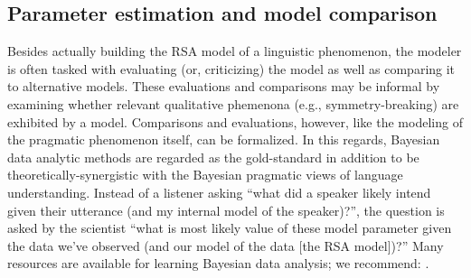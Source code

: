 \documentclass{sp}
\newcommand{\gcs}[1]{\textcolor{blue}{[gcs: #1]}}
\newcommand{\mht}[1]{\textcolor{purple}{[mht: #1]}}
\begin{document}




\subsection{Parameter estimation and model comparison}

Besides actually building the RSA model of a linguistic phenomenon, the modeler is often tasked with evaluating (or, criticizing) the model as well as comparing it to alternative models.
These evaluations and comparisons may be informal by examining whether relevant qualitative phemenona (e.g., symmetry-breaking) are exhibited by a model.
Comparisons and evaluations, however, like the modeling of the pragmatic phenomenon itself, can be formalized. 
In this regards, Bayesian data analytic methods are regarded as the gold-standard in addition to be theoretically-synergistic with the Bayesian pragmatic views of language understanding.
Instead of a listener asking ``what did a speaker likely intend given their utterance (and my internal model of the speaker)?'', the question is asked by the scientist ``what is most likely value of these model parameter given the data we've observed (and our model of the data [the RSA model])?''
Many resources are available for learning Bayesian data analysis; we recommend: \cite{gelman2013bayesian, kruschke2014doing, lee2014bayesian}.
\end{document}
